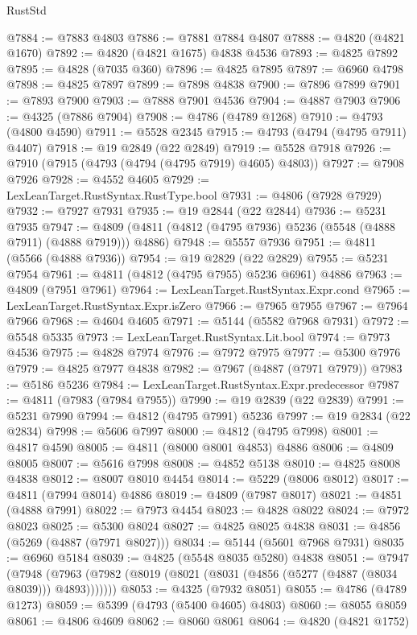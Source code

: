 \begin{lexlean}{RustStd}
\begin{coremodule}
{\begin{coremodule}
{{{{{{{{{{{{{{{{{{{{{{{{{{{{{{{{{{{{{{{{{{{{{{{{{{{{{{{{{{{{{{{{{{{{{{{{{{{{{{{{@7884 := @7883 @4803
@7886 := @7881 @7884 @4807
@7888 := @4820 (@4821 @1670)
@7892 := @4820 (@4821 @1675) @4838 @4536
@7893 := @4825 @7892
@7895 := @4828 (@7035 @360)
@7896 := @4825 @7895
@7897 := @6960 @4798
@7898 := @4825 @7897
@7899 := @7898 @4838
@7900 := @7896 @7899
@7901 := @7893 @7900
@7903 := @7888 @7901 @4536
@7904 := @4887 @7903
@7906 := @4325 (@7886 @7904)
@7908 := @4786 (@4789 @1268)
@7910 := @4793 (@4800 @4590)
@7911 := @5528 @2345
@7915 := @4793 (@4794 (@4795 @7911) @4407)
@7918 := @19 @2849 (@22 @2849)
@7919 := @5528 @7918
@7926 := @7910 (@7915 (@4793 (@4794 (@4795 @7919) @4605) @4803))
@7927 := @7908 @7926
@7928 := @4552 @4605
@7929 := LexLeanTarget.RustSyntax.RustType.bool
@7931 := @4806 (@7928 @7929)
@7932 := @7927 @7931
@7935 := @19 @2844 (@22 @2844)
@7936 := @5231 @7935
@7947 := @4809 (@4811 (@4812 (@4795 @7936) @5236 (@5548 (@4888 @7911) (@4888 @7919))) @4886)
@7948 := @5557 @7936
@7951 := @4811 (@5566 (@4888 @7936))
@7954 := @19 @2829 (@22 @2829)
@7955 := @5231 @7954
@7961 := @4811 (@4812 (@4795 @7955) @5236 @6961) @4886
@7963 := @4809 (@7951 @7961)
@7964 := LexLeanTarget.RustSyntax.Expr.cond
@7965 := LexLeanTarget.RustSyntax.Expr.isZero
@7966 := @7965 @7955
@7967 := @7964 @7966
@7968 := @4604 @4605
@7971 := @5144 (@5582 @7968 @7931)
@7972 := @5548 @5335
@7973 := LexLeanTarget.RustSyntax.Lit.bool
@7974 := @7973 @4536
@7975 := @4828 @7974
@7976 := @7972 @7975
@7977 := @5300 @7976
@7979 := @4825 @7977 @4838
@7982 := @7967 (@4887 (@7971 @7979))
@7983 := @5186 @5236
@7984 := LexLeanTarget.RustSyntax.Expr.predecessor
@7987 := @4811 (@7983 (@7984 @7955))
@7990 := @19 @2839 (@22 @2839)
@7991 := @5231 @7990
@7994 := @4812 (@4795 @7991) @5236
@7997 := @19 @2834 (@22 @2834)
@7998 := @5606 @7997
@8000 := @4812 (@4795 @7998)
@8001 := @4817 @4590
@8005 := @4811 (@8000 @8001 @4853) @4886
@8006 := @4809 @8005
@8007 := @5616 @7998
@8008 := @4852 @5138
@8010 := @4825 @8008 @4838
@8012 := @8007 @8010 @4454
@8014 := @5229 (@8006 @8012)
@8017 := @4811 (@7994 @8014) @4886
@8019 := @4809 (@7987 @8017)
@8021 := @4851 (@4888 @7991)
@8022 := @7973 @4454
@8023 := @4828 @8022
@8024 := @7972 @8023
@8025 := @5300 @8024
@8027 := @4825 @8025 @4838
@8031 := @4856 (@5269 (@4887 (@7971 @8027)))
@8034 := @5144 (@5601 @7968 @7931)
@8035 := @6960 @5184
@8039 := @4825 (@5548 @8035 @5280) @4838
@8051 := @7947
    (@7948 (@7963 (@7982 (@8019 (@8021 (@8031 (@4856 (@5277 (@4887 (@8034 @8039))) @4893)))))))
@8053 := @4325 (@7932 @8051)
@8055 := @4786 (@4789 @1273)
@8059 := @5399 (@4793 (@5400 @4605) @4803)
@8060 := @8055 @8059
@8061 := @4806 @4609
@8062 := @8060 @8061
@8064 := @4820 (@4821 @1752)
}}}}}}}}}}}}}}}}}}}}}}}}}}}}}}}}}}}}}}}}}}}}}}}}}}}}}}}}}}}}}}}}}}}}}}}}}}}}}}}}
\end{coremodule}}
\end{coremodule}
\end{lexlean}
